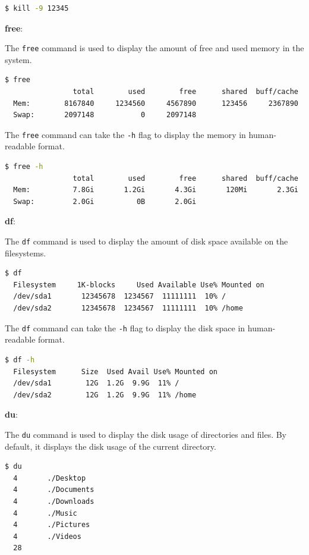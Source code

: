 \begin{lstlisting}[language=bash]
  $ kill -9 12345
\end{lstlisting}

\textbf{free}:

The \texttt{free} command is used to display the amount of free and used memory in the system.

\begin{lstlisting}[language=bash]
  $ free
                total        used        free      shared  buff/cache   available
  Mem:        8167840     1234560     4567890      123456     2367890     4567890
  Swap:       2097148           0     2097148
\end{lstlisting}

The \texttt{free} command can take the \texttt{-h} flag to display the memory in human-readable format.

\begin{lstlisting}[language=bash]
  $ free -h
                total        used        free      shared  buff/cache   available
  Mem:          7.8Gi       1.2Gi       4.3Gi       120Mi       2.3Gi       4.3Gi
  Swap:         2.0Gi          0B       2.0Gi
\end{lstlisting}

\textbf{df}:

The \texttt{df} command is used to display the amount of disk space available on the filesystems.

\begin{lstlisting}[language=bash]
  $ df
  Filesystem     1K-blocks     Used Available Use% Mounted on
  /dev/sda1       12345678  1234567  11111111  10% /
  /dev/sda2       12345678  1234567  11111111  10% /home
\end{lstlisting}

The \texttt{df} command can take the \texttt{-h} flag to display the disk space in human-readable format.

\begin{lstlisting}[language=bash]
  $ df -h
  Filesystem      Size  Used Avail Use% Mounted on
  /dev/sda1        12G  1.2G  9.9G  11% /
  /dev/sda2        12G  1.2G  9.9G  11% /home
\end{lstlisting}

\textbf{du}:

The \texttt{du} command is used to display the disk usage of directories and files.
By default, it displays the disk usage of the current directory.

\begin{lstlisting}[language=bash]
  $ du
  4       ./Desktop
  4       ./Documents
  4       ./Downloads
  4       ./Music
  4       ./Pictures
  4       ./Videos
  28
\end{lstlisting}

